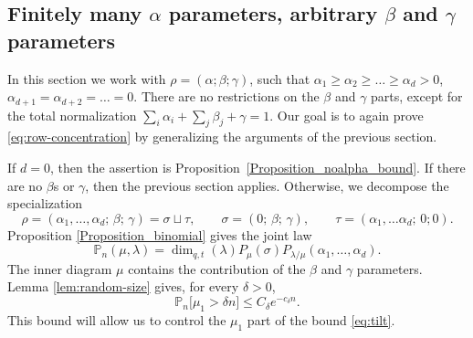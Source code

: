 \documentclass[11pt,reqno]{amsart}
\theoremstyle{definition}
\theoremstyle{remark}
\numberwithin{equation}{section}
\newcommand{\Prob}{\mathbb P}
\newcommand{\ddim}{\operatorname{dim}_{q,t}}
\begin{document}
\subsection{Finitely many $\alpha$ parameters, arbitrary $\beta$ and $\gamma$ parameters} \label{Section_finite_alpha}
In this section we work with $\rho=(\alpha;\beta;\gamma)$, such that $\alpha_1\ge\alpha_2\ge\dots\ge \alpha_{d}>0$, $\alpha_{d+1}=\alpha_{d+2}=\dots=0$. There are no restrictions on the $\beta$ and $\gamma$ parts, except for the total normalization $\sum_i\alpha_i+\sum_j\beta_j+\gamma=1$. Our goal is to again prove \eqref{eq:row-concentration} by generalizing the arguments of the previous section.


If $d=0$, then the assertion is Proposition~\ref{Proposition_noalpha_bound}. If there are no $\beta$s or $\gamma$, then the previous section applies. Otherwise, we decompose the specialization
\[
 \rho=(\alpha_1,\dots,\alpha_d;\, \beta;\, \gamma)=\sigma\sqcup \tau, \qquad
 \sigma=(0;\, \beta;\, \gamma), \qquad \tau=(\alpha_1,\dots\alpha_d;\, 0;0).
\]
Proposition \ref{Proposition_binomial} gives the joint law
\begin{equation}\label{eq:finite-joint}
 \Prob_n(\mu,\lambda)
 =\ddim(\lambda)P_\mu(\sigma)P_{\lambda/\mu}(\alpha_1,\dots,\alpha_d).
\end{equation}
The inner diagram $\mu$ contains the contribution of the $\beta$ and $\gamma$ parameters. 
Lemma \ref{lem:random-size} gives, for every $\delta>0$,
\begin{equation}\label{eq:inner-small}
 \Prob_n \bigl[\mu_1>\delta n\bigr]\le C_\delta e^{-c_\delta n}.
\end{equation}
This bound will allow us to control the $\mu_1$ part of the bound \eqref{eq:tilt}.
\end{document}
